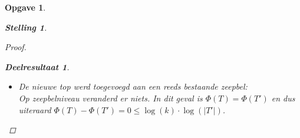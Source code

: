 \documentclass[12pt,hidelinks]{article}
\newtheorem{opgave}{Opgave}
\newtheorem{stelling}{Stelling}
\newtheorem{deelresultaat}{Deelresultaat}
\newcommand{\newln}{~\\\vspace{0.5em}}
\begin{document}
\begin{opgave}
\begin{description}
\begin{stelling}
\begin{proof}
\begin{deelresultaat}
\begin{itemize}
\begin{align*}
                                    \Phi(T') &= \Phi(T)-\log(k)\cdot(\sum_{i=1}^{k-1}{L_T(z_i)}+\sum_{i=1}^{k}{L_{T'}(z_i)}) \\
                                    &= \Phi(T)+\log(k)\cdot L_{T'}(z_1)+\log(k)\cdot(\sum_{i=1}^{k-1}{(L_{T'}(z_{i+1})-L_T(z_i))})
                                    \end{align*}
                                    Voor $i \ge 1$ geldt $A_T(z_i) \ge A_T(z_{i+1})+1$ en $A_T(z_{i+1})+1 = A_{T'}(z_{i+1})$.
                                    Dus $L_T(z_i) \ge L_{T'}(z_{i+1})$. Hieruit volgt dat $L_{T'}(z_{i+1})-L_T(z_i) \le 0$. 
                                    Uiteindelijk bekomen we:
                                    \begin{align*}
                                        \Phi(T') &\le \Phi(T) +\log(k)\cdot L_{T'}(z_1) \\
                                    &\le \Phi(T) +\log(k)\cdot \log(Z(T'))
                                \end{align*}
                                Want de wortelzeepbel heeft namelijk evenveel opvolgers (zichzelf meegeteld) als er zeepbellen in de boom zitten.
                                Een zeepbelboom bevat ook minstens evenveel toppen als zeepbellen dus $Z(T) \le |T|$ en ook
                                $\log(Z(T)) \le \log(|T|)$. We concluderen:
                                \begin{align*}
                                \Phi(T') &\le \Phi(T) + \log(k)\cdot \log(|T'|)\\
                                \Phi(T')-\Phi(T) &\le\log(k)\cdot \log(|T'|)
                                \end{align*}

                                \item De nieuwe top werd toegevoegd aan een reeds bestaande zeepbel:
                                    \newln
                                    Op zeepbelniveau veranderd er niets.
                                    In dit geval is $\Phi(T) = \Phi(T')$ en dus uiteraard $\Phi(T)-\Phi(T') = 0  \le\log(k)\cdot \log(|T'|)$.
                                    

\end{itemize}
\end{deelresultaat}
\end{proof}
\end{stelling}
\end{description}
\end{opgave}
\end{document}
